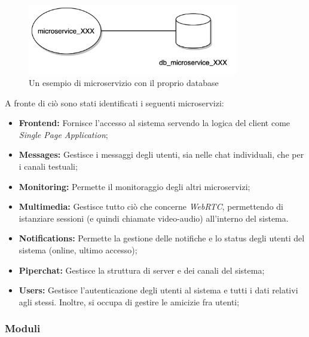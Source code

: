\begin{figure}[H]
    \centering
    \includegraphics[width=0.82\textwidth]{sections/03-design/img/microservice-db.jpg}
    \caption{Un esempio di microservizio con il proprio database}
    \label{fig:microservice-db}
\end{figure}

A fronte di ciò sono stati identificati i seguenti microservizi:

\begin{itemize}
    \item \textbf{Frontend:} Fornisce l'accesso al sistema servendo la logica del client come \emph{Single Page Application};

    \item \textbf{Messages:} Gestisce i messaggi degli utenti, sia nelle chat individuali, che per i canali testuali;

    \item \textbf{Monitoring:} Permette il monitoraggio degli altri microservizi;

    \item \textbf{Multimedia:} Gestisce tutto ciò che concerne \emph{WebRTC}, permettendo di istanziare sessioni (e quindi chiamate video-audio) all'interno del sistema.
    
    \item \textbf{Notifications:} Permette la gestione delle notifiche e lo status degli utenti del sistema (online, ultimo accesso);

    \item \textbf{Piperchat:} Gestisce la struttura di server e dei canali del sistema;

    \item \textbf{Users:} Gestisce l'autenticazione degli utenti al sistema e tutti i dati relativi agli stessi. Inoltre, si occupa di gestire le amicizie fra utenti;
\end{itemize}

%
%
%
\subsubsection{Moduli}

